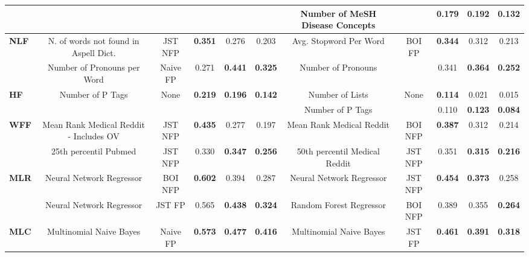\begin{table*}[t]
{\begin{tabular}{l|ccccc|ccccc}
 &  &  &  &  &  & Number of MeSH Disease Concepts  &  & 0.179  & \textbf{0.192}  & \textbf{0.132}\tabularnewline
\midrule 
\multirow{2}{*}{\textbf{NLF}} & N. of words not found in Aspell Dict.  & JST NFP  & \textbf{0.351}  & 0.276  & 0.203 & Avg. Stopword Per Word  & \multirow{2}{*}{BOI FP } & \textbf{0.344}  & 0.312  & 0.213\tabularnewline
 & Number of Pronouns per Word  & Naive FP  & 0.271  & \textbf{0.441}  & \textbf{0.325} & Number of Pronouns  &  & 0.341  & \textbf{0.364}  & \textbf{0.252}\tabularnewline
\midrule 
\multirow{2}{*}{\textbf{HF}} & \multirow{2}{*}{Number of P Tags } & \multirow{2}{*}{None } & \multirow{2}{*}{\textbf{0.219} } & \multirow{2}{*}{\textbf{0.196} } & \multirow{2}{*}{\textbf{0.142}} & Number of Lists  & \multirow{2}{*}{None} & \textbf{0.114}  & 0.021  & 0.015\tabularnewline
 &  &  &  &  &  & Number of P Tags  &  & 0.110  & \textbf{0.123}  & \textbf{0.084}\tabularnewline
\midrule 
\multirow{2}{*}{\textbf{WFF}} & Mean Rank Medical Reddit - Includes OV  & JST NFP  & \textbf{0.435}  & 0.277  & 0.197 & Mean Rank Medical Reddit  & BOI NFP  & \textbf{0.387}  & 0.312  & 0.214\tabularnewline
 & 25th percentil Pubmed  & JST NFP  & 0.330  & \textbf{0.347}  & \textbf{0.256} & 50th percentil Medical Reddit  & JST NFP  & 0.351  & \textbf{0.315}  & \textbf{0.216}\tabularnewline
\midrule 
\multirow{2}{*}{\textbf{MLR}} & Neural Network Regressor  & BOI NFP  & \textbf{0.602}  & 0.394  & 0.287 & Neural Network Regressor  & JST NFP  & \textbf{0.454}  & \textbf{0.373}  & 0.258\tabularnewline
 & Neural Network Regressor  & JST FP  & 0.565  & \textbf{0.438}  & \textbf{0.324} & Random Forest Regressor  & BOI NFP  & 0.389  & 0.355  & \textbf{0.264}\tabularnewline
\midrule 
\textbf{MLC} & Multinomial Naive Bayes  & Naive FP  & \textbf{0.573}  & \textbf{0.477}  & \textbf{0.416} & Multinomial Naive Bayes  & JST FP  & \textbf{0.461}  & \textbf{0.391}  & \textbf{0.318}\tabularnewline
\bottomrule
\end{tabular}
} %
\end{table*}
